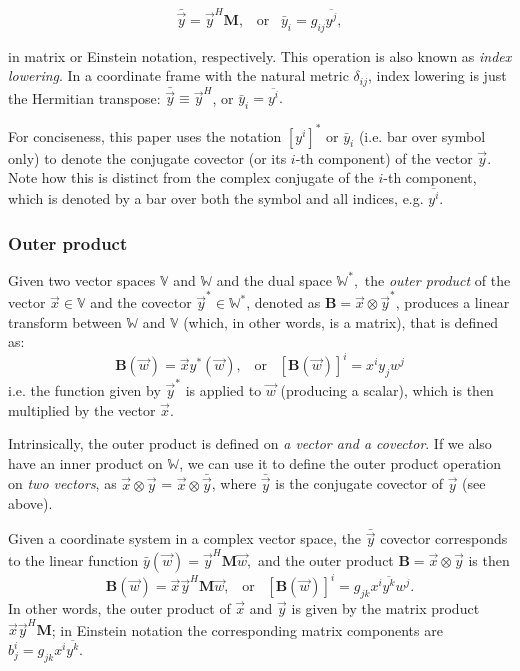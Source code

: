 \documentclass[]{aa}
\newcommand{\herm}{H}
\begin{document}
\[
\bar{\vec y} = \vec y^H \mathbf{M},\;\;\;\mbox{or}\;\;\;\bar y_i=g_{ij} \overline{y^j},
\]

in matrix or Einstein notation, respectively. This operation is also known as \emph{index lowering}.
In a coordinate frame with the natural metric $\delta_{ij}$, index lowering is just the Hermitian transpose: $\bar{\vec y}\equiv\vec y^H$, or $\bar y_i=\overline{y^i}.$

For conciseness, this paper uses the notation $[y^i]^*$ or $\bar y_i$ (i.e. bar over symbol only) to denote the conjugate covector (or its $i$-th component) of the vector $\vec y$. Note how this is distinct from the complex conjugate of the $i$-th component, which is denoted by a bar over both the symbol and all indices, e.g. $\overline{y^i}.$

\subsubsection{Outer product}
\label{sec:outer-prod}

Given two vector spaces $\mathbb{V}$ and $\mathbb{W}$ and the dual space $\mathbb{W}^*,$ the \emph{outer product} of the vector 
$\vec x \in \mathbb{V}$ and the covector $\vec y^* \in \mathbb{W}^*$, denoted as $\mathbf{B}=\vec x\otimes\vec y^*$,  produces a linear transform between $\mathbb{W}$ and $\mathbb{V}$ (which, in other words, is a matrix), that is defined as:
\[
\mathbf{B}(\vec w) = \vec x y^*(\vec w),\;\;\;\mbox{or}\;\;\;[\mathbf{B}(\vec w)]^i = x^iy_jw^j
\]
i.e. the function given by $\vec y^*$ is applied to $\vec w$ (producing a scalar), which is then multiplied by the vector $\vec x$. 

Intrinsically, the outer product is defined on \emph{a vector and a covector}. If we also have an inner product on $\mathbb{W}$, we can use it to define the outer product operation on \emph{two vectors}, as $\vec x\otimes \vec y$ = $\vec x\otimes \bar{\vec y}$, where $\bar{\vec y}$ is the conjugate covector of $\vec y$ (see above).

Given a coordinate system in a complex vector space, the $\bar{\vec y}$ covector corresponds to the linear function $\bar{y}(\vec w) = \vec y^\herm \mathbf{M} \vec w,$ and the outer product $\mathbf{B}=\vec x\otimes \vec y$ is then
\[
\mathbf{B}(\vec w) = \vec x \vec y^\herm \mathbf{M} \vec w, \;\;\;\mbox{or}\;\;\;[\mathbf{B}(\vec w)]^i = g_{jk} x^i \overline{y^k} w^j.
\]
In other words, the outer product of $\vec x$ and $\vec y$ is given by the matrix product $\vec x \vec y^\herm \mathbf{M}$; in Einstein notation the corresponding matrix components are $b^i_j = g_{jk} x^i \overline{y^k}.$ 
\end{document}

